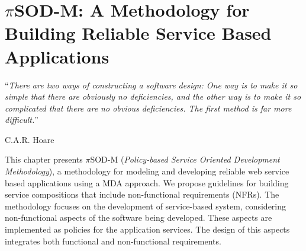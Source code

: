 \chapter{$\pi$SOD-M: A Methodology for Building Reliable Service Based
Applications}
\label{chapter:methodology}

\epigraph{``\textit{There are two ways of constructing a software design: One way is to make it so
simple that there are obviously no deficiencies, and the other way is to make it
so complicated that there are no obvious deficiencies. The first method is far
more difficult.}''}{C.A.R. Hoare}  



This chapter presents $\pi$SOD-M (\textit{Policy-based
Service Oriented Development Methodology}), a methodology for modeling and
developing reliable web service based applications using a MDA approach. We
propose guidelines for building service compositions that include non-functional
requirements (NFRs). The methodology focuses on the development of
service-based system, considering non-functional aspects of the software being
developed. These aspects are implemented as policies for the application
services. The design of this aspects integrates both functional and
non-functional requirements.
 
